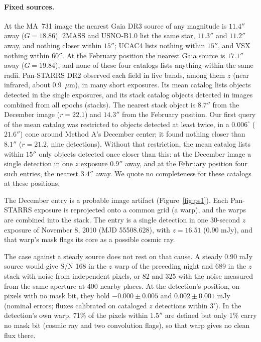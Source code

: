 \documentclass[11pt]{article}
\begin{document}
\begin{appendices}
\paragraph{Fixed sources.}
At the MA~731 image the nearest Gaia DR3 source of any magnitude is $11.4''$ away ($G=18.86$). 2MASS \cite{Skrutskie2006} and USNO-B1.0 \cite{Monet2003} list the same star, $11.3''$ and $11.2''$ away, and nothing closer within $15''$; UCAC4 \cite{Zacharias2013} lists nothing within $15''$, and VSX \cite{Watson2006} nothing within $60''$. At the February position the nearest Gaia source is $17.1''$ away ($G=19.84$), and none of these four catalogs lists anything within the same radii. Pan-STARRS DR2 \cite{Chambers2016,Flewelling2020} observed each field in five bands, among them $z$ (near infrared, about 0.9~$\mu$m), in many short exposures. Its mean catalog lists objects detected in the single exposures, and its stack catalog objects detected in images combined from all epochs (stacks). The nearest stack object is $8.7''$ from the December image ($r=22.1$) and $14.3''$ from the February position. Our first query of the mean catalog was restricted to objects detected at least twice, in a $0.006^\circ$ ($21.6''$) cone around Method A's December center; it found nothing closer than $8.1''$ ($r=21.2$, nine detections). Without that restriction, the mean catalog lists within $15''$ only objects detected once closer than this: at the December image a single detection in one $z$ exposure $0.9''$ away, and at the February position four such entries, the nearest $3.4''$ away. We quote no completeness for these catalogs at these positions.

The December entry is a probable image artifact (Figure~\ref{fig:ps1}). Each Pan-STARRS exposure is reprojected onto a common grid (a warp), and the warps are combined into the stack. The entry is a single detection in one 30-second $z$ exposure of November 8, 2010 (MJD 55508.628), with $z=16.51$ (0.90 mJy), and that warp's mask flags its core as a possible cosmic ray.

The case against a steady source does not rest on that cause. A steady 0.90 mJy source would give S/N 168 in the $z$ warp of the preceding night and 689 in the $z$ stack with noise from independent pixels, or 82 and 325 with the noise measured from the same aperture at 400 nearby places. At the detection's position, on pixels with no mask bit, they hold $-0.000\pm0.005$ and $0.002\pm0.001$ mJy (nominal errors; fluxes calibrated on cataloged $z$ detections within $3'$). In the detection's own warp, 71\% of the pixels within $1.5''$ are defined but only 1\% carry no mask bit (cosmic ray and two convolution flags), so that warp gives no clean flux there.


\end{appendices}
\end{document}
